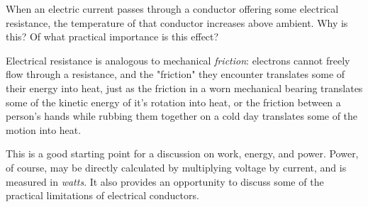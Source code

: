 

When an electric current passes through a conductor offering some electrical resistance, the temperature of that conductor increases above ambient.  Why is this?  Of what practical importance is this effect?







Electrical resistance is analogous to mechanical {\it friction}: electrons cannot freely flow through a resistance, and the "friction" they encounter translates some of their energy into heat, just as the friction in a worn mechanical bearing translates some of the kinetic energy of it's rotation into heat, or the friction between a person's hands while rubbing them together on a cold day translates some of the motion into heat.







This is a good starting point for a discussion on work, energy, and power.  Power, of course, may be directly calculated by multiplying voltage by current, and is measured in {\it watts}.  It also provides an opportunity to discuss some of the practical limitations of electrical conductors.




